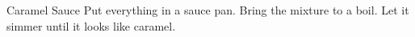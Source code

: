 \documentclass[../main.tex]{subfiles}
\begin{document}
\begin{recipe}{Caramel Sauce}{}{}
    Put everything in a sauce pan. Bring the mixture to a boil.
    Let it simmer until it looks like caramel.
\end{recipe}
\end{document}
